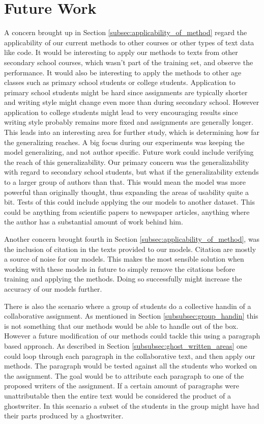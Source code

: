 \section{Future Work} \label{sec:future_work}

A concern brought up in Section \ref{subsec:applicability_of_method} regard the
applicability of our current methods to other courses or other types of text
data like code. It would be interesting to apply our methods to texts from other
secondary school courses, which wasn't part of the training set, and observe
the performance. It would also be interesting to apply the methods to other age
classes such as primary school students or college students. Application to
primary school students might be hard since assignments are typically shorter
and writing style might change even more than during secondary school. However
application to college students might lead to very encouraging results since
writing style probably remains more fixed and assignments are generally longer.
This leads into an interesting area for further study, which is determining how
far the generalizing reaches. A big focus during our experiments was keeping the
model generalizing, and not author specific. Future work could include verifying
the reach of this generalizability. Our primary concern was the generalizability
with regard to secondary school students, but what if the generalizability
extends to a larger group of authors than that. This would mean the model was
more powerful than originally thought, thus expanding the areas of usability
quite a bit. Tests of this could include applying the our models to another
dataset. This could be anything from scientific papers to newspaper articles,
anything where the author has a substantial amount of work behind him.

Another concern brought fourth in Section \ref{subsec:applicability_of_method},
was the inclusion of citation in the texts provided to our models. Citation are
mostly a source of noise for our models. This makes the most sensible solution
when working with these models in future to simply remove the citations before
training and applying the methods. Doing so successfully might increase the
accuracy of our models further.

There is also the scenario where a group of students do a collective handin of a
collaborative assignment. As mentioned in Section \ref{subsubsec:group_handin}
this is not something that our methods would be able to handle out of the box.
However a future modification of our methods could tackle this using a paragraph
based approach. As described in Section \ref{subsubsec:ghost_written_areas}
one could loop through each paragraph in the collaborative text, and then
apply our methods. The paragraph would be tested against all the students who
worked on the assignment. The goal would be to attribute each paragraph to one
of the proposed writers of the assignment. If a certain amount of paragraphs
were unattributable then the entire text would be considered the product of a
ghostwriter. In this scenario a subset of the students in the group might have
had their parts produced by a ghostwriter.

